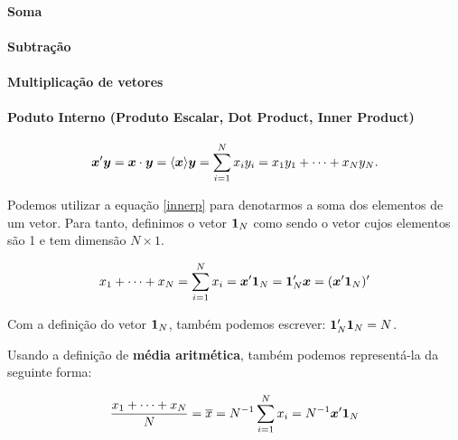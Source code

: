 \documentclass[11pt, oneside, a4paper, article]{article}
\numberwithin{equation}{section}
\begin{document}
\begin{description}
\paragraph{Soma}

\paragraph{Subtração}

\paragraph{Multiplicação de vetores}

\paragraph{Poduto Interno (Produto Escalar, Dot Product, Inner Product)}

\begin{align}\label{innerp}
	\boldsymbol{x}' \boldsymbol{y} = \boldsymbol{x} \cdot \boldsymbol{y} = \langle \boldsymbol{x} \rangle{\ensuremath{\boldsymbol{y}}} = \sum_{i=1}^{N} x_{i} y_{i} = x_{1}y_{1} + \dots + x_{N}y_{N}.
\end{align}

Podemos utilizar a equação \eqref{innerp} para denotarmos a soma dos elementos de um vetor.
Para tanto, definimos o vetor $\boldsymbol{1}_{N}$ como sendo o vetor cujos elementos são 1 e tem dimensão $N \times 1$.
\cite[p. 977, A.2.7]{greene-7ed}

\begin{align*}
	x_{1} + \dots + x_{N} =
	\sum_{i=1}^{N} x_{i} =
	\boldsymbol{x}' \boldsymbol{1}_{N} = 
	\boldsymbol{1}_{N}' \boldsymbol{x} = 
	(\boldsymbol{x}' \boldsymbol{1}_{N})'
\end{align*}

Com a definição do vetor $\boldsymbol{1}_{N}$, também podemos escrever:
$\boldsymbol{1}_{N}' \boldsymbol{1}_{N} = N$.

Usando a definição de \textbf{média aritmética}, também podemos representá-la da seguinte forma:

\begin{align*}
	\frac{x_{1} + \dots + x_{N}}{N} =
	\overline{x} =
	N^{-1} \sum_{i=1}^{N} x_{i} =
	N^{-1} \boldsymbol{x}' \boldsymbol{1}_{N}
\end{align*}


\end{description}
\end{document}
